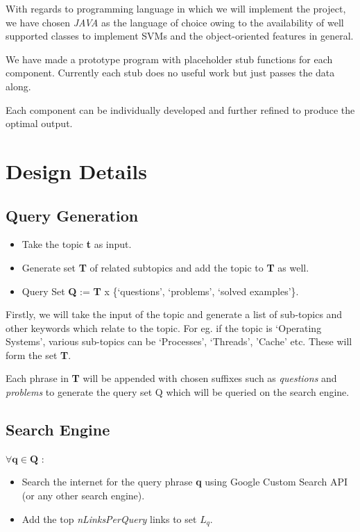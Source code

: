 \documentclass[10pt,a4paper]{report}
\begin{document}
With regards to programming language in which we will implement the project, we have chosen \textit{JAVA} as the language of choice owing to the availability of well supported classes to implement SVMs and the object-oriented features in general.

We have made a prototype program with placeholder stub functions for each component. Currently each stub does no useful work but just passes the data along.

Each component can be individually developed and further refined to produce the optimal output.


\chapter{Design Details}

\section{Query Generation}

\begin{itemize}

	\item Take the topic \textbf{t} as input.
	\item Generate set \textbf{T} of related subtopics and add the topic to \textbf{T} as well.
	\item Query Set \textbf{Q} := \textbf{T} x \{`questions', `problems', `solved examples'\}.

\end{itemize} 

Firstly, we will take the input of the topic and generate a list of sub-topics and other keywords which relate to the topic. For eg. if the topic is `Operating Systems', various sub-topics can be `Processes', `Threads', 'Cache' etc. These will form the set \textbf{T}.

Each phrase in \textbf{T} will be appended with chosen suffixes such as \textit{questions} and \textit{problems} to generate the query set Q which will be queried on the search engine.

\section{Search Engine}

$\forall \textbf{q} \in \textbf{Q}$ :

\begin{itemize}

	\item Search the internet for the query phrase \textbf{q} using Google Custom Search API (or any other search engine).
	\item Add the top \textit{nLinksPerQuery} links to set \textbf{$L_{q}$}.

\end{itemize}
\end{document}
